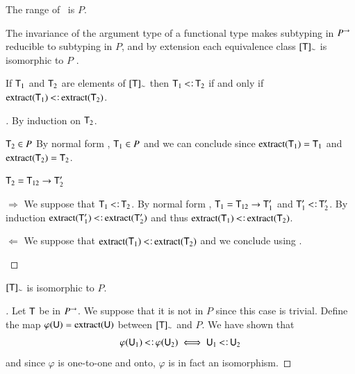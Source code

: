 \documentclass{report}
\begin{document}
  \begin{thm}
    The range of \extract\ is $P$.
  \end{thm}
  The invariance of the argument type of a functional type makes
  subtyping in $P^\rightarrow$ reducible to subtyping in $P$, and by extension
  each equivalence class $\lbrack\textsf{T}\rbrack_\sim$ is isomorphic to $P$
  .
  \begin{thm}
    If $\textsf{T}_1$ and $\textsf{T}_2$ are elements of $\lbrack\textsf{T}\rbrack_\sim$ then
    $\type{T}_1\subtype\type{T}_2$ if and only if $\extract(\type{T}_1)\subtype\extract(\type{T}_2)$.
  \end{thm}
  \begin{proof}[]
    By induction on $\textsf{T}_2$.
    \begin{indcase}{$\textsf{T}_2\in P$}
       By normal form , $\textsf{T}_1\in P$ and we can conclude
       since $\mathop{\rm extract}\nolimits(\textsf{T}_1)=\textsf{T}_1$ and $\mathop{\rm extract}\nolimits(\textsf{T}_2)=\textsf{T}_2$.
    \end{indcase}
    \begin{indcase}{$\textsf{T}_2=\textsf{T}_{12}\rightarrow\textsf{T}_2'$}
      \begin{innerindcase}{$\Rightarrow$}
        We suppose that $\type{T}_1\subtype\type{T}_2$.
        By normal form , $\textsf{T}_1=\textsf{T}_{12}\rightarrow\textsf{T}_1'$ and
        $\type{T}_1'\subtype\type{T}_2'$. By induction $\extract(\type{T}_1')\subtype\extract(\type{T}_2')$
        and thus $\extract(\type{T}_1)\subtype\extract(\type{T}_2)$.
      \end{innerindcase}
      \begin{innerindcase}{$\Leftarrow$}
        We suppose that $\extract(\type{T}_1)\subtype\extract(\type{T}_2)$ and we conclude
        using .
      \end{innerindcase}
    \end{indcase}
  \end{proof}
  \begin{thm}
    $\lbrack\textsf{T}\rbrack_\sim$ is isomorphic to $P$.
  \end{thm}
  \begin{proof}[]
    Let $\textsf{T}$ be in $P^\rightarrow$. We suppose that it is not in $P$ since this case is trivial.
    Define the map $\varphi(\textsf{U})=\mathop{\rm extract}\nolimits(\textsf{\textsf{U}})$ between $\lbrack\textsf{T}\rbrack_\sim$
    and $P$. We have shown that
    \begin{displaymath}
      \varphi(\type{U}_1)\subtype\varphi(\type{U}_2) \iff \type{U}_1 \subtype \type{U}_2
    \end{displaymath}
    and since $\varphi$ is one-to-one and onto, $\varphi$ is in fact an isomorphism.
  \end{proof}
\end{document}
